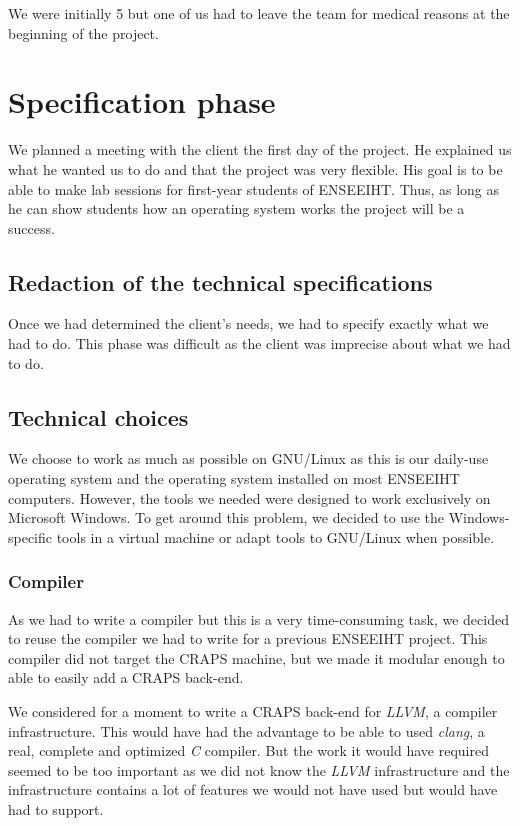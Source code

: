 \documentclass[openany]{book}
\begin{document}
    We were initially 5 but one of us had to leave the team for medical reasons
    at the beginning of the project.

  \chapter{Specification phase}
    We planned a meeting with the client the first day of the project. He
    explained us what he wanted us to do and that the project was very flexible.
    His goal is to be able to make lab sessions for first-year students of
    ENSEEIHT. Thus, as long as he can show students how an operating system
    works the project will be a success.

    \section{Redaction of the technical specifications}
      Once we had determined the client's needs, we had to specify exactly what
      we had to do. This phase was difficult as the client was imprecise about
      what we had to do.

    \section{Technical choices}
      We choose to work as much as possible on GNU/Linux as this is our
      daily-use operating system and the operating system installed on most
      ENSEEIHT computers.
      However, the tools we needed were designed to work exclusively on
      Microsoft Windows. To get around this problem, we decided to use the
      Windows-specific tools in a virtual machine or adapt tools to GNU/Linux
      when possible.

      \subsection{Compiler}
        As we had to write a compiler but this is a very time-consuming task, we
        decided to reuse the compiler we had to write for a previous ENSEEIHT
        project. This compiler did not target the CRAPS machine, but we made it
        modular enough to able to easily add a CRAPS back-end.

        We considered for a moment to write a CRAPS back-end for \emph{LLVM}, a
        compiler infrastructure\cite{llvm}. This would have had the advantage to
        be able to used \emph{clang}, a real, complete and optimized
        \emph{C} compiler. But the work it would have required seemed to be too
        important as we did not know the \emph{LLVM} infrastructure and the
        infrastructure contains a lot of features we would not have used but
        would have had to support.
\end{document}
